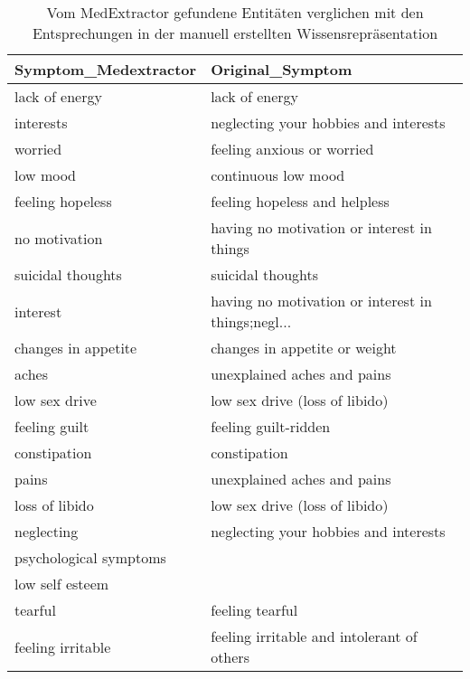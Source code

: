 \begin{table}
\begin{center}
\begin{tabular}{ll}
\toprule
  Symptom\_Medextractor &                                   Original\_Symptom \\
\midrule
        lack of energy &                                     lack of energy \\
             interests &              neglecting your hobbies and interests \\
               worried &                         feeling anxious or worried \\
              low mood &                                continuous low mood \\
      feeling hopeless &                      feeling hopeless and helpless \\
         no motivation &         having no motivation or interest in things \\
     suicidal thoughts &                                  suicidal thoughts \\
              interest & having no motivation or interest in things;negl... \\
   changes in appetite &                      changes in appetite or weight \\
                 aches &                        unexplained aches and pains \\
         low sex drive &                     low sex drive (loss of libido) \\
         feeling guilt &                               feeling guilt-ridden \\
          constipation &                                       constipation \\
                 pains &                        unexplained aches and pains \\
        loss of libido &                     low sex drive (loss of libido) \\
            neglecting &              neglecting your hobbies and interests \\
psychological symptoms &                                                    \\
       low self esteem &                                                    \\
               tearful &                                    feeling tearful \\
     feeling irritable &         feeling irritable and intolerant of others \\
\bottomrule
\end{tabular}
\caption{Vom MedExtractor gefundene Entitäten verglichen mit den Entsprechungen in der manuell erstellten Wissensrepräsentation}
\label{tab:vergleich_medextractor_manuell}
\end{center}
\end{table}

